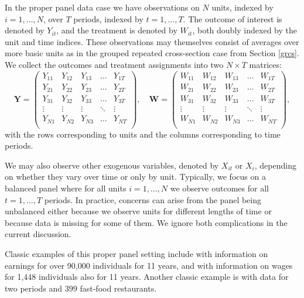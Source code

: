 \documentclass[letterpaper,12pt,leqno]{article}
\begin{document}
In the proper panel data case we have observations on $N$ units, indexed by $i=1,\ldots,N$, over $T$ periods, indexed by $t=1,\ldots,T$. The outcome of interest is denoted by $Y_{it}$, and the treatment is denoted by $W_{it}$, both doubly indexed by the unit and time indices. These observations may themselves consist of averages over more basic units as in the grouped repeated cross-section case from Section \ref{grcs}. We collect the outcomes and treatment assignments into two $N\times T$ matrices:
\[ \mathbf{Y}=
\left(
\begin{array}{ccccc}
	Y_{11} & Y_{12} & Y_{13}  & \dots & Y_{1T} \\
	Y_{21}  & Y_{22} & Y_{23}   & \dots & Y_{2T}  \\
	Y_{31}  & Y_{32} & Y_{33}   & \dots & Y_{3T}  \\
	\vdots   &  \vdots & \vdots &\ddots &\vdots \\
	Y_{N1}  & Y_{N2} & Y_{N3}   & \dots & Y_{NT}  \\
\end{array}
\right),\quad
 \mathbf{W}=
\left(
\begin{array}{ccccc}
	W_{11} & W_{12} & W_{13}  & \dots & W_{1T} \\
	W_{21}  & W_{22} & W_{23}   & \dots & W_{2T}  \\
	W_{31}  & W_{32} & W_{33}   & \dots & W_{3T}  \\
	\vdots   &  \vdots & \vdots &\ddots &\vdots \\
	W_{N1}  & W_{N2} & W_{N3}   & \dots & W_{NT}  \\
\end{array}
\right),
\]
with the rows corresponding to units and the columns corresponding to time periods.

We may also observe other exogenous variables, denoted by $X_{it}$ or $X_i$, depending on whether they vary over time or only by unit. Typically, we focus on a {balanced panel} where for all units $i=1,\ldots,N$ we observe outcomes for all $t=1,\ldots,T$ periods. In practice, concerns can arise from the panel being {unbalanced} either because we observe units for different lengths of time or because data is missing for some of them. We ignore both complications in the current discussion.
 
Classic examples of this proper panel setting include  \citep{ashenfelter1978estimating} with information on earnings for over 90,000 individuals for 11 years, and
\citep{abowd1989covariance} with information on wages for 1,448 individuals also for 11 years.
Another classic example is \citep{card1994minimum} with data for two periods and 399 fast-food restaurants. 
\end{document}

